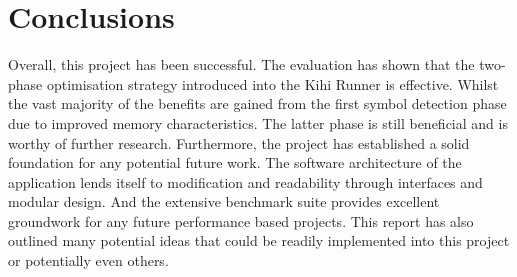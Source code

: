 \chapter{Conclusions}\label{C:con}
Overall, this project has been successful. The evaluation has shown that the two-phase optimisation strategy introduced into the Kihi Runner is effective. Whilst the vast majority of the benefits are gained from the first symbol detection phase due to improved memory characteristics. The latter phase is still beneficial and is worthy of further research. Furthermore, the project has established a solid foundation for any potential future work. The software architecture of the application lends itself to modification and readability through interfaces and modular design. And the extensive benchmark suite provides excellent groundwork for any future performance based projects. This report has also outlined many potential ideas that could be readily implemented into this project or potentially even others.
